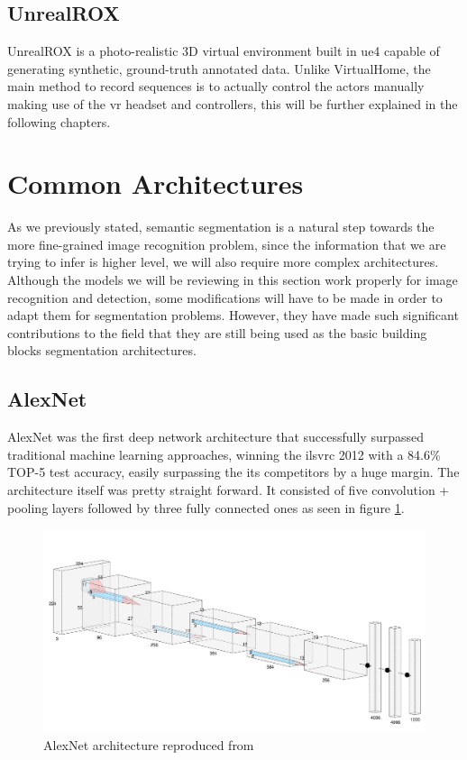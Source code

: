 \subsection{UnrealROX}
UnrealROX \cite{DBLP:journals/corr/abs-1810-06936} is a photo-realistic 3D virtual environment built in \gls{ue4} capable of generating synthetic, ground-truth annotated data. Unlike VirtualHome, the main method to record sequences is to actually control the actors manually making use of the \gls{vr} headset and controllers, this will be further explained in the following chapters.

\section{Common Architectures}
As we previously stated, semantic segmentation is a natural step towards the more fine-grained image recognition problem, since the information that we are trying to infer is higher level, we will also require more complex architectures. Although the models we will be reviewing in this section work properly for image recognition and detection, some modifications will have to be made in order to adapt them for segmentation problems. However, they have made such significant contributions to the field that they are still being used as the basic building blocks segmentation architectures.

\subsection{AlexNet}
AlexNet was the first deep network architecture that successfully surpassed traditional machine learning approaches, winning the \gls{ilsvrc} 2012 with a 84.6\% TOP-5 test accuracy, easily surpassing the its competitors by a huge margin. The architecture itself was pretty straight forward. It consisted of five convolution + pooling layers followed by three fully connected ones as seen in figure \ref{alexnet}.


\begin{figure}[h]
	\includegraphics[scale=0.3]{archivos/alexnet.png}
	\centering
	\caption{AlexNet architecture reproduced from \cite{AlexNet}}
	\label{alexnet}
\end{figure}

